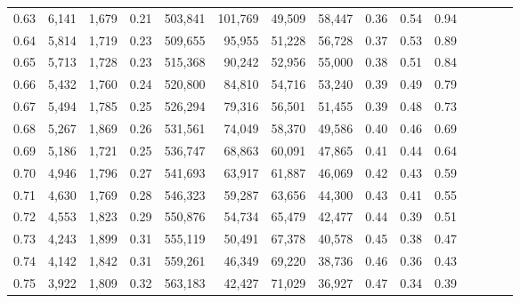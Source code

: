 \begin{tabular}{rrrcrrrrrrrrrrr}
0.63 &  6,141 &  1,679 &                                       0.21 &  503,841 &  101,769 &   49,509 &   58,447 &  0.36 &  0.54 &                         0.94 \\
0.64 &  5,814 &  1,719 &                                       0.23 &  509,655 &   95,955 &   51,228 &   56,728 &  0.37 &  0.53 &                         0.89 \\
0.65 &  5,713 &  1,728 &                                       0.23 &  515,368 &   90,242 &   52,956 &   55,000 &  0.38 &  0.51 &                         0.84 \\
0.66 &  5,432 &  1,760 &                                       0.24 &  520,800 &   84,810 &   54,716 &   53,240 &  0.39 &  0.49 &                         0.79 \\
0.67 &  5,494 &  1,785 &                                       0.25 &  526,294 &   79,316 &   56,501 &   51,455 &  0.39 &  0.48 &                         0.73 \\
0.68 &  5,267 &  1,869 &                                       0.26 &  531,561 &   74,049 &   58,370 &   49,586 &  0.40 &  0.46 &                         0.69 \\
0.69 &  5,186 &  1,721 &                                       0.25 &  536,747 &   68,863 &   60,091 &   47,865 &  0.41 &  0.44 &                         0.64 \\
0.70 &  4,946 &  1,796 &                                       0.27 &  541,693 &   63,917 &   61,887 &   46,069 &  0.42 &  0.43 &                         0.59 \\
0.71 &  4,630 &  1,769 &                                       0.28 &  546,323 &   59,287 &   63,656 &   44,300 &  0.43 &  0.41 &                         0.55 \\
0.72 &  4,553 &  1,823 &                                       0.29 &  550,876 &   54,734 &   65,479 &   42,477 &  0.44 &  0.39 &                         0.51 \\
0.73 &  4,243 &  1,899 &                                       0.31 &  555,119 &   50,491 &   67,378 &   40,578 &  0.45 &  0.38 &                         0.47 \\
0.74 &  4,142 &  1,842 &                                       0.31 &  559,261 &   46,349 &   69,220 &   38,736 &  0.46 &  0.36 &                         0.43 \\
0.75 &  3,922 &  1,809 &                                       0.32 &  563,183 &   42,427 &   71,029 &   36,927 &  0.47 &  0.34 &                         0.39 \\

\end{tabular}
